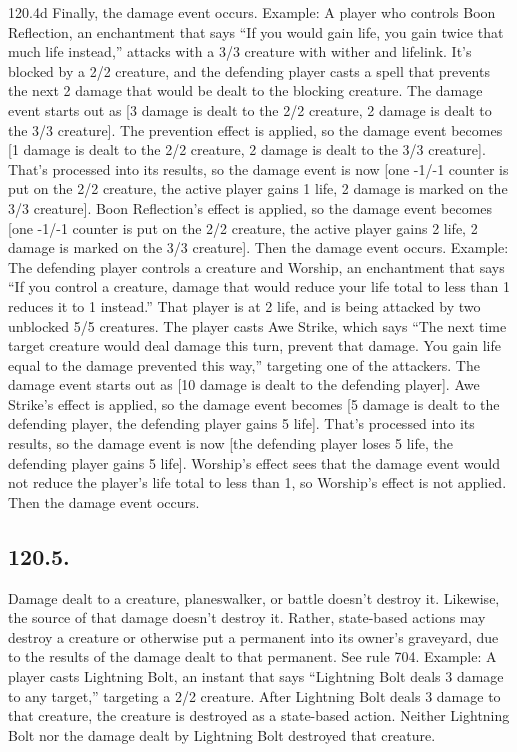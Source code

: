 120.4d Finally, the damage event occurs.
Example: A player who controls Boon Reflection, an enchantment that says “If you would gain life, you gain twice that much life instead,” attacks with a 3/3 creature with wither and lifelink. It’s blocked by a 2/2 creature, and the defending player casts a spell that prevents the next 2 damage that would be dealt to the blocking creature. The damage event starts out as [3 damage is dealt to the 2/2 creature, 2 damage is dealt to the 3/3 creature]. The prevention effect is applied, so the damage event becomes [1 damage is dealt to the 2/2 creature, 2 damage is dealt to the 3/3 creature]. That’s processed into its results, so the damage event is now [one -1/-1 counter is put on the 2/2 creature, the active player gains 1 life, 2 damage is marked on the 3/3 creature]. Boon Reflection’s effect is applied, so the damage event becomes [one -1/-1 counter is put on the 2/2 creature, the active player gains 2 life, 2 damage is marked on the 3/3 creature]. Then the damage event occurs.
Example: The defending player controls a creature and Worship, an enchantment that says “If you control a creature, damage that would reduce your life total to less than 1 reduces it to 1 instead.” That player is at 2 life, and is being attacked by two unblocked 5/5 creatures. The player casts Awe Strike, which says “The next time target creature would deal damage this turn, prevent that damage. You gain life equal to the damage prevented this way,” targeting one of the attackers. The damage event starts out as [10 damage is dealt to the defending player]. Awe Strike’s effect is applied, so the damage event becomes [5 damage is dealt to the defending player, the defending player gains 5 life]. That’s processed into its results, so the damage event is now [the defending player loses 5 life, the defending player gains 5 life]. Worship’s effect sees that the damage event would not reduce the player’s life total to less than 1, so Worship’s effect is not applied. Then the damage event occurs.

\subsection*{120.5.}
Damage dealt to a creature, planeswalker, or battle doesn’t destroy it. Likewise, the source of that damage doesn’t destroy it. Rather, state-based actions may destroy a creature or otherwise put a permanent into its owner’s graveyard, due to the results of the damage dealt to that permanent. See rule 704.
Example: A player casts Lightning Bolt, an instant that says “Lightning Bolt deals 3 damage to any target,” targeting a 2/2 creature. After Lightning Bolt deals 3 damage to that creature, the creature is destroyed as a state-based action. Neither Lightning Bolt nor the damage dealt by Lightning Bolt destroyed that creature.

